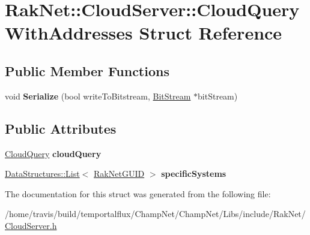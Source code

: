 \hypertarget{struct_rak_net_1_1_cloud_server_1_1_cloud_query_with_addresses}{\section{Rak\-Net\-:\-:Cloud\-Server\-:\-:Cloud\-Query\-With\-Addresses Struct Reference}
\label{struct_rak_net_1_1_cloud_server_1_1_cloud_query_with_addresses}
}
\subsection*{Public Member Functions}
\begin{DoxyCompactItemize}
\item 
\hypertarget{struct_rak_net_1_1_cloud_server_1_1_cloud_query_with_addresses_aabee1a2ea8ed81cf0db0b1ea2b4a46d5}{void {\bfseries Serialize} (bool write\-To\-Bitstream, \hyperlink{class_rak_net_1_1_bit_stream}{Bit\-Stream} $\ast$bit\-Stream)}\label{struct_rak_net_1_1_cloud_server_1_1_cloud_query_with_addresses_aabee1a2ea8ed81cf0db0b1ea2b4a46d5}

\end{DoxyCompactItemize}
\subsection*{Public Attributes}
\begin{DoxyCompactItemize}
\item 
\hypertarget{struct_rak_net_1_1_cloud_server_1_1_cloud_query_with_addresses_a4ccc6f9775e4a17c1af0fc6bc3aa7f94}{\hyperlink{struct_rak_net_1_1_cloud_query}{Cloud\-Query} {\bfseries cloud\-Query}}\label{struct_rak_net_1_1_cloud_server_1_1_cloud_query_with_addresses_a4ccc6f9775e4a17c1af0fc6bc3aa7f94}

\item 
\hypertarget{struct_rak_net_1_1_cloud_server_1_1_cloud_query_with_addresses_a5d510f186feb2d2509b96580a94311af}{\hyperlink{class_data_structures_1_1_list}{Data\-Structures\-::\-List}$<$ \hyperlink{struct_rak_net_1_1_rak_net_g_u_i_d}{Rak\-Net\-G\-U\-I\-D} $>$ {\bfseries specific\-Systems}}\label{struct_rak_net_1_1_cloud_server_1_1_cloud_query_with_addresses_a5d510f186feb2d2509b96580a94311af}

\end{DoxyCompactItemize}


The documentation for this struct was generated from the following file\-:\begin{DoxyCompactItemize}
\item 
/home/travis/build/temportalflux/\-Champ\-Net/\-Champ\-Net/\-Libs/include/\-Rak\-Net/\hyperlink{_cloud_server_8h}{Cloud\-Server.\-h}\end{DoxyCompactItemize}
